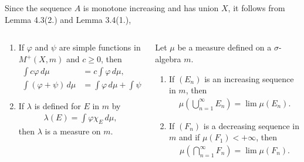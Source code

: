 \documentclass{beamer}
\numberwithin{equation}{section}
\begin{document}
\begin{frame}\frametitle{{\normalsize \secname} \\ {\large \subsecname}}
    Since the sequence $A$ is monotone increasing and has union $X$, it follows from Lemma 4.3(2.) and Lemma 3.4(1.),
    \begingroup
    \footnotesize
    \begin{columns}
        \begin{column}{0.48\textwidth}
            \begin{lemma}[4.3]
                \begin{enumerate}
                    \item If $\varphi$ and $\psi$ are simple functions in $M^+(X,m)$ and $c \geq 0$, then
                    \begin{align}
                        \int c \varphi \, d\mu &= c \int \varphi \, d\mu, \\
                        \int \left( \varphi + \psi \right) \, d\mu &= \int \varphi \, d\mu + \int \psi \, d\mu.
                    \end{align}
                    \item If $\lambda$ is defined for $E$ in $m$ by
                    \begin{align}
                        \lambda(E) = \int \varphi \chi_E \, d\mu,
                    \end{align}
                    then $\lambda$ is a measure on $m$.
                \end{enumerate}
            \end{lemma}
        \end{column}
        \begin{column}{0.48\textwidth}
            \begin{lemma}[3.4]
                Let $\mu$ be a measure defined on a $\sigma$-algebra $m$.
                \begin{enumerate}
                    \item If $(E_n)$ is an increasing sequence in $m$, then
                    \begin{align}
                        \mu\left(\bigcup_{n = 1}^\infty E_n\right) = \lim \mu\left(E_n\right).
                    \end{align}
                    \item If $(F_n)$ is a decreasing sequence in $m$ and if $\mu\left(F_1\right) < +\infty$, then
                    \begin{align}
                        \mu\left(\bigcap_{n = 1}^\infty F_n\right) = \lim \mu\left(F_n\right).
                    \end{align}
                \end{enumerate}
            \end{lemma}
        \end{column}
    \end{columns}
    \endgroup
\end{frame}
\end{document}

